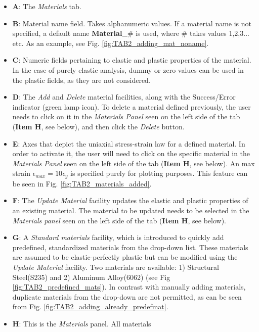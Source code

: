 \begin{itemize}
	\item \textbf{A}: The \textit{Materials} tab.
	\item \textbf{B}: Material name field. Takes alphanumeric values. If a 
	material name is not specified, a default name \textbf{Material}\_$\#$ is 
	used, where $\#$ takes values 1,2,3... etc. As an example, see Fig. 
	\ref{fig:TAB2_adding_mat_noname}.
	\item \textbf{C}: Numeric fields pertaining to elastic and plastic 
	properties of the material. In the case of purely elastic analysis, dummy 
	or zero values can be used in the plastic fields, as they are not 
	considered.
	\item \textbf{D}: The \textit{Add} and \textit{Delete} material facilities, 
	along with the Success/Error indicator (green lamp icon). To delete a 
	material defined previously, the user needs to click on it in the 
	\textit{Materials Panel} seen on the left side of the tab (\textbf{Item H}, 
	see below), and then click the \textit{Delete} button.
	\item \textbf{E}: Axes that depict the uniaxial stress-strain law for a 
	defined material. In order to activate it, the user will need to click on 
	the specific material in the \textit{Materials Panel} seen on the left side 
	of the tab (\textbf{Item H}, see below). An max strain 
	$\epsilon_{max}=10\epsilon_y$ is specified purely for plotting purposes. 
	This feature can be seen in Fig. \ref{fig:TAB2_materials_added}.
	\item \textbf{F}: The \textit{Update Material} facility updates the elastic 
	and plastic properties of an existing material. The material to be updated 
	needs to be selected in the \textit{Materials panel} seen on the left side 
	of the tab (\textbf{Item H}, see below). 
	\item \textbf{G}: A \textit{Standard materials} facility, which is 
	introduced to quickly add predefined, standardized materials from the 
	drop-down list. These materials are assumed to be elastic-perfectly plastic 
	but can be modified using the \textit{Update Material} facility. Two 
	materials are available: 1) Structural Steel(S235) and 2) Aluminum 
	Alloy(6062) (see Fig \ref{fig:TAB2_predefined_mats}). In contrast with 
	manually adding materials, duplicate 
	materials from the drop-down are not permitted, as can be seen from Fig. 
	\ref{fig:TAB2_adding_already_predefmat}. 
	\item \textbf{H}: This is the \textit{Materials} panel. All materials 

\end{itemize}

